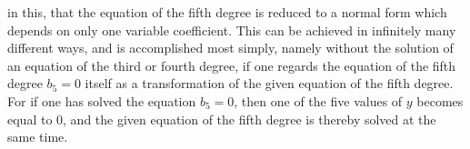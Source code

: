
in this, that the equation of the fifth degree is reduced to a normal form which depends on only one variable coefficient. This can be achieved in infinitely many different ways, and is accomplished most simply, namely without the solution of an equation of the third or fourth degree, if one regards the equation of the fifth degree $b_5 = 0$ itself as a transformation of the given equation of the fifth degree. For if one has solved the equation $b_5 = 0$, then one of the five values of $y$ becomes equal to 0, and the given equation of the fifth degree is thereby solved at the same time.


